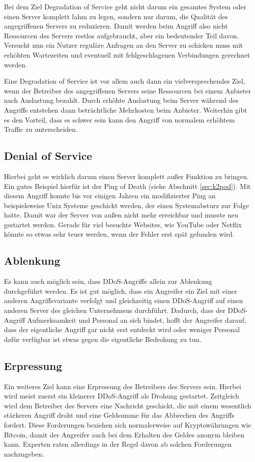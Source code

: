 Bei dem Ziel Degradation of Service geht nicht darum ein gesamtes System oder einen Server komplett lahm zu legen, sondern nur darum, die Qualität des angegriffenen Servers zu reduzieren. Damit werden beim Angriff also nicht Ressourcen des Servers restlos aufgebraucht, aber ein bedeutender Teil davon. Versucht nun ein Nutzer reguläre Anfragen an den Server zu schicken muss mit erhöhten Wartezeiten und eventuell mit fehlgeschlagenen Verbindungen gerechnet werden.

Eine Degradation of Service ist vor allem auch dann ein vielversprechendes Ziel, wenn der Betreiber des angegriffenen Servers seine Ressourcen bei einem Anbieter nach Auslastung bezahlt. Durch erhöhte Auslastung beim Server während des Angriffs entstehen dann beträchtliche Mehrkosten beim Anbieter. Weiterhin gibt es den Vorteil, dass es schwer sein kann den Angriff von normalem erhöhtem Traffic zu unterscheiden.

\subsection{Denial of Service}

Hierbei geht es wirklich darum einen Server komplett außer Funktion zu bringen. Ein gutes Beispiel hierfür ist der Ping of Death (siehe Abschnitt \ref{sec:k2pod}). Mit diesem Angriff konnte bis vor einigen Jahren ein modifizierter Ping an beispielsweise Unix Systeme geschickt werden, der einen Systemabsturz zur Folge hatte. Damit war der Server von außen nicht mehr erreichbar und musste neu gestartet werden. Gerade für viel besuchte Websites, wie YouTube oder Netflix könnte so etwas sehr teuer werden, wenn der Fehler erst spät gefunden wird.

\subsection{Ablenkung}

Es kann auch möglich sein, dass DDoS-Angriffe allein zur Ablenkung durchgeführt werden. Es ist gut möglich, dass ein Angreifer ein Ziel mit einer anderen Angriffsvariante verfolgt und gleichzeitig einen DDoS-Angriff auf einen anderen Server des gleichen Unternehmens durchführt. Dadurch, dass der DDoS-Angriff Aufmerksamkeit und Personal an sich bindet, hofft der Angreifer darauf, dass der eigentliche Angriff gar nicht erst entdeckt wird oder weniger Personal dafür verfügbar ist etwas gegen die eigentliche Bedrohung zu tun.

\subsection{Erpressung}

Ein weiteres Ziel kann eine Erpressung des Betreibers des Servers sein. Hierbei wird meist zuerst ein kleinerer DDoS-Angriff als Drohung gestartet. Zeitgleich wird dem Betreiber des Servers eine Nachricht geschickt, die mit einem wesentlich stärkeren Angriff droht und eine Geldsumme für das Abbrechen des Angriffs fordert. Diese Forderungen beziehen sich normalerweise auf Kryptowährungen wie Bitcoin, damit der Angreifer auch bei dem Erhalten des Geldes anonym bleiben kann. Experten raten allerdings in der Regel davon ab solchen Forderungen nachzugeben.

